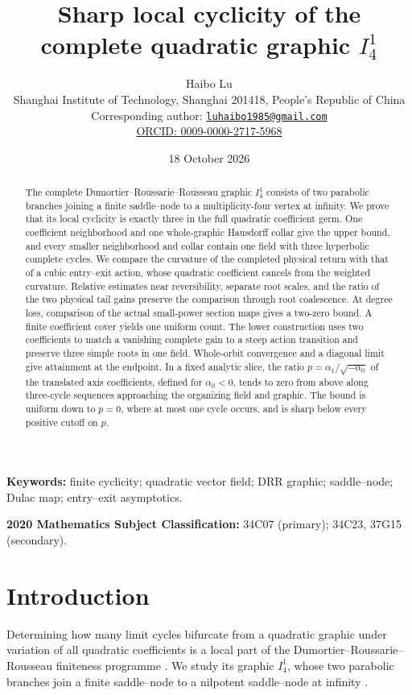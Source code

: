 \documentclass[a4paper,11pt]{article}
\title{Sharp local cyclicity of the complete quadratic graphic $I_4^1$}
\author{Haibo Lu\\
\small Shanghai Institute of Technology, Shanghai 201418, People's Republic of China\\
\small Corresponding author: \href{mailto:luhaibo1985@gmail.com}{\texttt{luhaibo1985@gmail.com}}\\
\small \href{https://orcid.org/0009-0000-2717-5968}{ORCID: 0009-0000-2717-5968}}
\date{18 October 2026}
\numberwithin{equation}{section}
\theoremstyle{definition}
\theoremstyle{remark}
\begin{document}
\maketitle

\begin{abstract}
The complete Dumortier--Roussarie--Rousseau graphic $I_4^1$ consists of
two parabolic branches joining a finite saddle--node to a
multiplicity-four vertex at infinity. We prove that its local cyclicity
is exactly three in the full quadratic coefficient germ. One
coefficient neighborhood and one whole-graphic Hausdorff collar give
the upper bound, and every smaller neighborhood and collar contain one
field with three hyperbolic complete cycles. We compare the curvature
of the completed physical return with that of a cubic entry--exit
action, whose quadratic coefficient cancels from the weighted
curvature. Relative estimates near reversibility, separate root scales,
and the ratio of the two physical tail gains preserve the comparison
through root coalescence. At degree loss, comparison of the actual
small-power section maps gives a two-zero bound. A finite coefficient
cover yields one uniform count. The lower construction uses two
coefficients to match a vanishing complete gain to a steep action
transition and preserve three simple roots in one field. Whole-orbit
convergence and a diagonal limit give attainment at the endpoint.
In a fixed analytic slice, the ratio
$p=\alpha_1/\sqrt{-\alpha_0}$ of the translated axis coefficients,
defined for $\alpha_0<0$,
tends to zero from above along three-cycle sequences approaching the
organizing field and graphic. The bound is uniform down to $p=0$, where at most
one cycle occurs, and is sharp below every positive cutoff on $p$.
\end{abstract}

\noindent\textbf{Keywords:} finite cyclicity; quadratic vector field;
DRR graphic; saddle--node; Dulac map; entry--exit asymptotics.

\medskip
\noindent\textbf{2020 Mathematics Subject Classification:}
34C07 (primary); 34C23, 37G15 (secondary).

\medskip
\section{Introduction}
\label{sec:introduction}

Determining how many limit cycles bifurcate from a quadratic graphic
under variation of all quadratic coefficients is a local part of the
Dumortier--Roussarie--Rousseau finiteness programme
\cite[Introduction, author copy pp.~1--2]{DIR02}. We study its graphic
$I_4^1$, whose two parabolic branches join a finite saddle--node to a
nilpotent saddle--node at infinity
\cite[Proposition~4.2.2 and Figure~8, journal pp.~111--113]{DRR94}.
\end{document}
